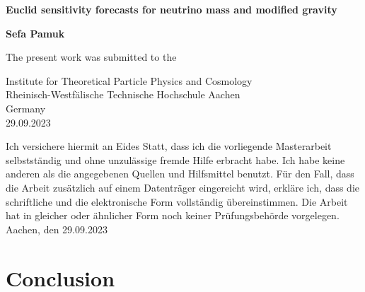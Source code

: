 \documentclass[oneside]{book}
\begin{document}
\begin{titlepage}
    \begin{center}
        
        \vspace*{1cm}
        \huge
        \textbf{Euclid sensitivity forecasts for neutrino mass and modified gravity}
        
        \vspace{0.5cm}

             
        \vspace{1.5cm}
        \large
        \textbf{Sefa Pamuk}
 
        \vfill
             
        The present work was submitted to the 
             
        \vspace{0.8cm}
                   
        Institute for Theoretical Particle Physics and Cosmology \\
        Rheinisch-Westfälische Technische Hochschule Aachen \\
        Germany\\
        29.09.2023
             
    \end{center}
 \end{titlepage}
Ich versichere hiermit an Eides Statt, dass ich die vorliegende Masterarbeit selbstständig und ohne unzulässige fremde Hilfe erbracht habe. Ich habe keine anderen als die angegebenen Quellen und Hilfsmittel benutzt. Für den Fall, dass die Arbeit zusätzlich auf einem Datenträger eingereicht wird, erkläre ich, dass die schriftliche und die elektronische Form vollständig übereinstimmen. Die Arbeit hat in gleicher oder ähnlicher Form noch keiner Prüfungsbehörde vorgelegen. \\

Aachen, den 29.09.2023
\tableofcontents








\chapter{Conclusion}
\end{document}
